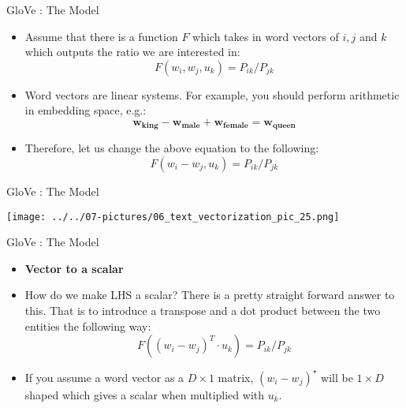 \documentclass[11pt]{beamer}
\begin{document}
\begin{frame}{GloVe : The Model }
	\begin{itemize}
		\item Assume that there is a function $F$ which takes in word vectors of $i,j$ and $k$ which outputs the ratio we are interested in: \begin{equation}F(w_i,w_j, u_k) = P_{ik}/P_{jk} \end{equation}
		\item Word vectors are linear systems. For example, you should perform arithmetic in embedding space, e.g.: \begin{equation} \mathbf{w_{king} - w_{male} + w_{female} = w_{queen}}\end{equation}
		\item Therefore, let us change the above equation to the following: \begin{equation} F(w_i - w_j, u_k) = P_{ik}/P_{jk} \end{equation}
	\end{itemize}
\end{frame}
\begin{frame}{GloVe : The Model}
	\begin{center}
	\texttt{[image: ../../07-pictures/06\_text\_vectorization\_pic\_25.png]}
	\end{center}
\end{frame}
\begin{frame}{GloVe : The Model }
	\begin{itemize}
		\item \textbf{Vector to a scalar}
		\item How do we make LHS a scalar? There is a pretty straight forward answer to this. That is to introduce a transpose and a dot product between the two entities the following way: \begin{equation} F((w_i - w_j)^T \cdot u_k) = P_{ik}/P_{jk} \end{equation}
		\item If you assume a word vector as a $D\times 1$ matrix, $(w_i - w_j)^\star$ will be $1\times D$ shaped which gives a scalar when multiplied with $u_k$.
	\end{itemize}
\end{frame}
\end{document}
